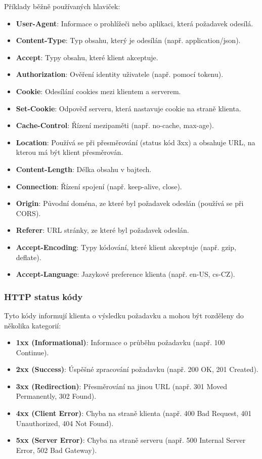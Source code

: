 Příklady běžně používaných hlaviček:
\begin{itemize}
    \item \textbf{User-Agent}: Informace o prohlížeči nebo aplikaci, která požadavek odesílá.
    \item \textbf{Content-Type}: Typ obsahu, který je odesílán (např. application/json).
    \item \textbf{Accept}: Typy obsahu, které klient akceptuje.
    \item \textbf{Authorization}: Ověření identity uživatele (např. pomocí tokenu).
    \item \textbf{Cookie}: Odesílání cookies mezi klientem a serverem.
    \item \textbf{Set-Cookie}: Odpověď serveru, která nastavuje cookie na straně klienta.
    \item \textbf{Cache-Control}: Řízení mezipaměti (např. no-cache, max-age).
    \item \textbf{Location}: Používá se při přesměrování (status kód 3xx) a obsahuje URL, na kterou má být klient přesměrován.
    \item \textbf{Content-Length}: Délka obsahu v bajtech.
    \item \textbf{Connection}: Řízení spojení (např. keep-alive, close).
    \item \textbf{Origin}: Původní doména, ze které byl požadavek odeslán (používá se při CORS).
    \item \textbf{Referer}: URL stránky, ze které byl požadavek odeslán.
    \item \textbf{Accept-Encoding}: Typy kódování, které klient akceptuje (např. gzip, deflate).
    \item \textbf{Accept-Language}: Jazykové preference klienta (např. en-US, cs-CZ).
\end{itemize}

\subsubsection*{HTTP status kódy}
Tyto kódy informují klienta o výsledku požadavku a mohou být rozděleny do několika kategorií:

\begin{itemize}
    \item \textbf{1xx (Informational)}: Informace o průběhu požadavku (např. 100 Continue).
    \item \textbf{2xx (Success)}: Úspěšné zpracování požadavku (např. 200 OK, 201 Created).
    \item \textbf{3xx (Redirection)}: Přesměrování na jinou URL (např. 301 Moved Permanently, 302 Found).
    \item \textbf{4xx (Client Error)}: Chyba na straně klienta (např. 400 Bad Request, 401 Unauthorized, 404 Not Found).
    \item \textbf{5xx (Server Error)}: Chyba na straně serveru (např. 500 Internal Server Error, 502 Bad Gateway).
\end{itemize}

